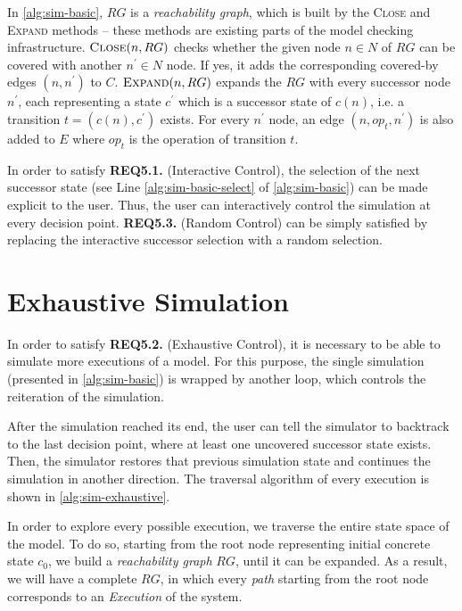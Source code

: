 In \autoref{alg:sim-basic}, $RG$ is a \textit{reachability graph}, which is built by the \textsc{Close} and \textsc{Expand} methods -- these methods are existing parts of the model checking infrastructure. $\textsc{Close}(n, RG)$ checks whether the given node $n \in N$ of $RG$ can be covered with another $n^\prime \in N$ node. If yes, it adds the corresponding covered-by edges $(n, n^\prime)$ to $C$. $\textsc{Expand}(n, RG)$ expands the $RG$ with every successor node $n^\prime$, each representing a state $c^\prime$ which is a successor state of $c(n)$, i.e. a transition $t = (c(n), c^\prime)$ exists. For every $n^\prime$ node, an edge $(n, op_t, n^\prime)$ is also added to $E$ where $op_t$ is the operation of transition $t$.

In order to satisfy \textbf{REQ5.1.} (Interactive Control), the selection of the next successor state (see Line \ref{alg:sim-basic-select} of \autoref{alg:sim-basic}) can be made explicit to the user. Thus, the user can interactively control the simulation at every decision point. \textbf{REQ5.3.} (Random Control) can be simply satisfied by replacing the interactive successor selection with a random selection.

\section{Exhaustive Simulation}\label{sec:exhaustive-sim}

In order to satisfy \textbf{REQ5.2.} (Exhaustive Control), it is necessary to be able to simulate more executions of a model. For this purpose, the single simulation (presented in \autoref{alg:sim-basic}) is wrapped by another loop, which controls the reiteration of the simulation.

After the simulation reached its end, the user can tell the simulator to backtrack to the last decision point, where at least one uncovered successor state exists. Then, the simulator restores that previous simulation state and continues the simulation in another direction. The traversal algorithm of every execution is shown in \autoref{alg:sim-exhaustive}.

In order to explore every possible execution, we traverse the entire state space of the model. To do so, starting from the root node representing initial concrete state $c_0$, we build a \emph{reachability graph} $RG$, until it can be expanded. As a result, we will have a complete $RG$, in which every \emph{path} starting from the root node corresponds to an \emph{Execution} of the system.

